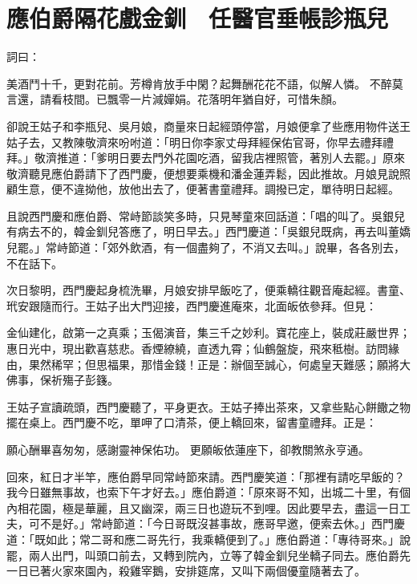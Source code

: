 %

\chapter{應伯爵隔花戲金釧　任醫官垂帳診瓶兒}

詞曰：

美酒鬥十千，更對花前。芳樽肯放手中閑？起舞酬花花不語，似解人憐。
不醉莫言還，請看枝間。已飄零一片減嬋娟。花落明年猶自好，可惜朱顏。

卻說王姑子和李瓶兒、吳月娘，商量來日起經頭停當，月娘便拿了些應用物件送王姑子去，又教陳敬濟來吩咐道：「明日你李家丈母拜經保佑官哥，你早去禮拜禮拜。」敬濟推道：「爹明日要去門外花園吃酒，留我店裡照管，著別人去罷。」原來敬濟聽見應伯爵請下了西門慶，便想要乘機和潘金蓮弄鬆，因此推故。月娘見說照顧生意，便不違拗他，放他出去了，便著書童禮拜。調撥已定，單待明日起經。

且說西門慶和應伯爵、常峙節談笑多時，只見琴童來回話道：「唱的叫了。吳銀兒有病去不的，韓金釧兒答應了，明日早去。」西門慶道：「吳銀兒既病，再去叫董嬌兒罷。」常峙節道：「郊外飲酒，有一個盡夠了，不消又去叫。」說畢，各各別去，不在話下。

次日黎明，西門慶起身梳洗畢，月娘安排早飯吃了，便乘轎往觀音庵起經。書童、玳安跟隨而行。王姑子出大門迎接，西門慶進庵來，北面皈依參拜。但見：

金仙建化，啟第一之真乘；玉偈演音，集三千之妙利。寶花座上，裝成莊嚴世界；惠日光中，現出歡喜慈悲。香煙繚繞，直透九霄；仙鶴盤旋，飛來秪樹。訪問緣由，果然稀罕；但思福果，那惜金錢！正是：辦個至誠心，何處皇天難感；願將大佛事，保祈殤子彭籛。

王姑子宣讀疏頭，西門慶聽了，平身更衣。王姑子捧出茶來，又拿些點心餅饊之物擺在桌上。西門慶不吃，單呷了口清茶，便上轎回來，留書童禮拜。正是：

願心酬畢喜匆匆，感謝靈神保佑功。
更願皈依蓮座下，卻教關煞永亨通。

回來，紅日才半竿，應伯爵早同常峙節來請。西門慶笑道：「那裡有請吃早飯的？我今日雖無事故，也索下午才好去。」應伯爵道：「原來哥不知，出城二十里，有個內相花園，極是華麗，且又幽深，兩三日也遊玩不到哩。因此要早去，盡這一日工夫，可不是好。」常峙節道：「今日哥既沒甚事故，應哥早邀，便索去休。」西門慶道：「既如此；常二哥和應二哥先行，我乘轎便到了。」應伯爵道：「專待哥來。」說罷，兩人出門，叫頭口前去，又轉到院內，立等了韓金釧兒坐轎子同去。應伯爵先一日已著火家來園內，殺雞宰鵝，安排筵席，又叫下兩個優童隨著去了。

